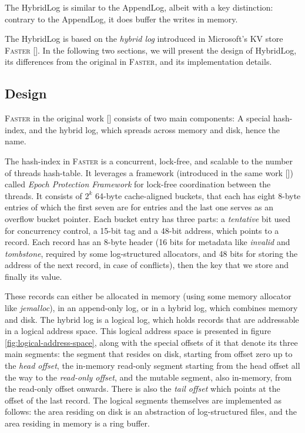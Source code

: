 The HybridLog is similar to the AppendLog, albeit with a key distinction: contrary to the AppendLog, it does buffer the writes in memory.

The HybridLog is based on the \textit{hybrid log} introduced in Microsoft's KV store \textsc{Faster} [\cite{faster}]. In the following two sections, we will present the design of HybridLog, its differences from the original in \textsc{Faster}, and its implementation details.

\subsection{Design}

\textsc{Faster} in the original work [\cite{faster}] consists of two main components: A special hash-index, and the hybrid log, which spreads across memory and disk, hence the name.

The hash-index in \textsc{Faster} is a concurrent, lock-free, and scalable to the number of threads hash-table. It leverages a framework (introduced in the same work [\cite{faster}]) called \textit{Epoch Protection Framework} for lock-free coordination between the threads. It consists of $2^k$ 64-byte cache-aligned buckets, that each has eight 8-byte entries of which the first seven are for entries and the last one serves as an overflow bucket pointer. Each bucket entry has three parts: a \textit{tentative} bit used for concurrency control, a 15-bit tag and a 48-bit address, which points to a record. Each record has an 8-byte header (16 bits for metadata like \textit{invalid} and \textit{tombstone}, required by some log-structured allocators, and 48 bits for storing the address of the next record, in case of conflicts), then the key that we store and finally its value.


These records can either be allocated in memory (using some memory allocator like \textit{jemalloc}), in an append-only log, or in a hybrid log, which combines memory and disk. The hybrid log is a logical log, which holds records that are addressable in a logical address space. This logical address space is presented in figure \ref{fig:logical-address-space}, along with the special offsets of it that denote its three main segments: the segment that resides on disk, starting from offset zero up to the \textit{head offset}, the in-memory read-only segment starting from the head offset all the way to the \textit{read-only offset}, and the mutable segment, also in-memory, from the read-only offset onwards. There is also the \textit{tail offset} which points at the offset of the last record.
The logical segments themselves are implemented as follows: the area residing on disk is an abstraction of log-structured files, and the area residing in memory is a ring buffer.


